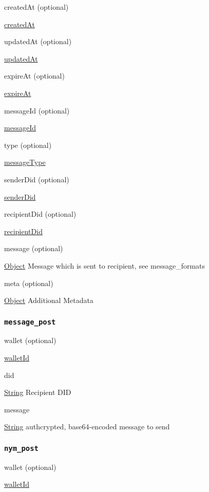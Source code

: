createdAt (optional)

{\protect\hyperlink{createdAt}{createdAt}}

updatedAt (optional)

{\protect\hyperlink{updatedAt}{updatedAt}}

expireAt (optional)

{\protect\hyperlink{expireAt}{expireAt}}

messageId (optional)

{\protect\hyperlink{messageId}{messageId}}

type (optional)

{\protect\hyperlink{messageType}{messageType}}

senderDid (optional)

{\protect\hyperlink{senderDid}{senderDid}}

recipientDid (optional)

{\protect\hyperlink{recipientDid}{recipientDid}}

message (optional)

{\protect\hyperlink{object}{Object}} Message which is sent to recipient,
see message\_formats

meta (optional)

{\protect\hyperlink{object}{Object}} Additional Metadata

\hypertarget{message_post}{%
\subsubsection{\texorpdfstring{\protect\hypertarget{message_post}{}{\texttt{message\_post}}}{message\_post}}\label{message_post}}

wallet (optional)

{\protect\hyperlink{walletId}{walletId}}

did

{\protect\hyperlink{string}{String}} Recipient DID

message

{\protect\hyperlink{string}{String}} authcrypted, base64-encoded message
to send

\hypertarget{nym_post}{%
\subsubsection{\texorpdfstring{\protect\hypertarget{nym_post}{}{\texttt{nym\_post}}}{nym\_post}}\label{nym_post}}

wallet (optional)

{\protect\hyperlink{walletId}{walletId}}

